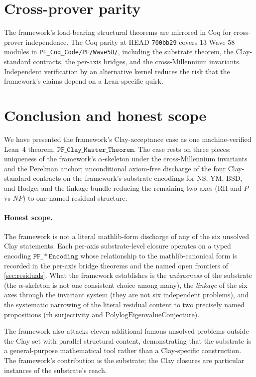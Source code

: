 \documentclass[11pt,a4paper]{article}
\theoremstyle{plain}
\theoremstyle{definition}
\begin{document}
\section{Cross-prover parity}

The framework's load-bearing structural theorems are mirrored in
Coq for cross-prover independence. The Coq parity at HEAD
\texttt{700bb29} covers 13 Wave 58 modules in
\texttt{PF\_Coq\_Code/PF/Wave58/}, including the substrate theorem,
the Clay-standard contracts, the per-axis bridges, and the
cross-Millennium invariants. Independent verification by an
alternative kernel reduces the risk that the framework's claims
depend on a Lean-specific quirk.

\section{Conclusion and honest scope}

We have presented the framework's Clay-acceptance case as one
machine-verified Lean~4 theorem, $\mathtt{PF\_Clay\_Master\_Theorem}$.
The case rests on three pieces: uniqueness of the framework's
$\alpha$-skeleton under the cross-Millennium invariants and the
Perelman anchor; unconditional axiom-free discharge of the four Clay-standard
contracts on the framework's substrate encodings for NS, YM, BSD,
and Hodge; and the linkage bundle reducing the remaining two axes
(RH and $P$ vs $NP$) to one named residual structure.

\paragraph{Honest scope.} The framework is not a literal
mathlib-form discharge of any of the six unsolved Clay statements.
Each per-axis substrate-level closure operates on a typed encoding
$\mathtt{PF\_*Encoding}$ whose relationship to the mathlib-canonical
form is recorded in the per-axis bridge theorems and the named open
frontiers of \cref{sec:residuals}. What the framework establishes is
the \emph{uniqueness} of the substrate (the $\alpha$-skeleton is not
one consistent choice among many), the \emph{linkage} of the six
axes through the invariant system (they are not six independent
problems), and the systematic narrowing of the literal residual
content to two precisely named propositions
($\mathrm{rh\_surjectivity}$ and
$\mathrm{PolylogEigenvalueConjecture}$).

The framework also attacks eleven additional famous unsolved
problems outside the Clay set with parallel structural content,
demonstrating that the substrate is a general-purpose mathematical
tool rather than a Clay-specific construction. The framework's
contribution is the substrate; the Clay closures are particular
instances of the substrate's reach.
\end{document}
